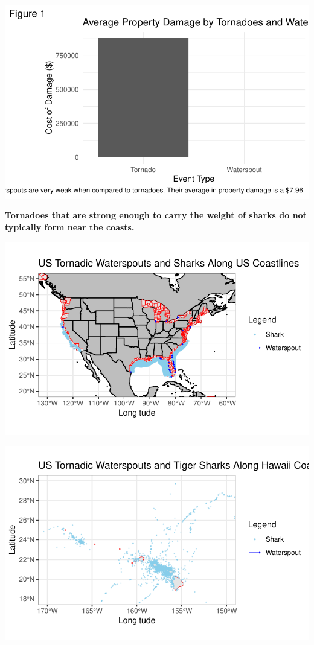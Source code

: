 \documentclass[
  letterpaper,
  DIV=11,
  numbers=noendperiod]{scrreprt}
\begin{document}
\includegraphics{draft-results2_files/figure-pdf/Average Property Damage Caused by Tornadoes vs Waterspouts Chart-1.pdf}

\textbf{Tornadoes that are strong enough to carry the weight of sharks
do not typically form near the coasts.}

\includegraphics{draft-results2_files/figure-pdf/Path of Waterspouts in the US-1.pdf}

\includegraphics{draft-results2_files/figure-pdf/Path of Waterspouts in the US-2.pdf}
\end{document}
